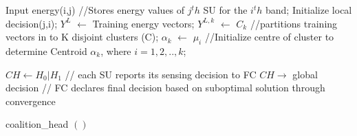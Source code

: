 \documentclass[]{article}
\title{}
\author{}
\begin{document}
\maketitle

\begin{abstract}

\end{abstract}

\begin{algorithm} [t]
	Input energy(i,j) //Stores energy values of $j^th$ SU for the $i^th$ band; \newline
	Initialize local decision(j,i); \newline
	$Y^L$ $\leftarrow$ Training energy vectors; \newline
	$Y^{L,k}$ $\leftarrow$ $C_k$ 
	//partitions training vectors in to K disjoint clusters (C); \newline
	$\alpha_k$ $\leftarrow$ $\mu_i$ 
	//Initialize centre of cluster to determine Centroid $\alpha_k$, where $i=1,2,..,k$; \newline
	
		\DontPrintSemicolon
		
	
	$CH \leftarrow  H_0 | H_1$\; // each SU reports its sensing decision to FC \newline
	$CH \rightarrow $ global decision\; // FC declares final decision based on suboptimal solution through convergence
	
	\caption{Proposed CSS scheme using k-means clustering algorithm\label{kmeans}}
\end{algorithm}


\begin{algorithm}
	coalition\_head $( )$ 
		\newline
	
	
\caption{Distributed algorithm for Coalition head selection\label{DACS}}
\end{algorithm}
\end{document}
